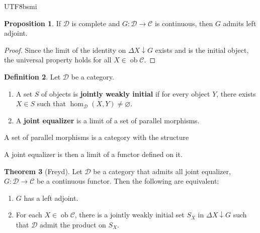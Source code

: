 \documentclass[12pt]{article}
\theoremstyle{definition}
\newtheorem{definition}{Definition}[section]
\newtheorem{theorem}[definition]{Theorem}
\newtheorem{property}[definition]{Proposition}
\newcommand\<{\langle}
\renewcommand\>{\rangle}
\DeclareMathOperator{\ob}{ob}
\begin{document}
\begin{CJK}{UTF8}{bsmi}
\begin{property}
    If $\mathcal{D}$ is complete and $G:\mathcal{D}\to\mathcal{C}$ is continuous, then $G$ admits left adjoint.
\end{property}
\begin{proof}
    Since the limit of the identity on $\Delta X\downarrow G$ exists and is the initial object, the universal property holds for all $X\in\ob\mathcal{C}$.
\end{proof}

\begin{definition}
    Let $\mathcal{D}$ be a category.
    \begin{enumerate}
        \item A set $S$ of objects is \textbf{jointly weakly initial} if for every object $Y$, there exists $X\in S$ such that $\hom_\mathcal{D}(X,Y)\ne\varnothing$.
        \item A \textbf{joint equalizer} is a limit of a set of parallel morphisms.
    \end{enumerate}
\end{definition}

A set of parallel morphisms is a category with the structure
\begin{center}
\end{center}
A joint equalizer is then a limit of a functor defined on it.

\begin{theorem}[Freyd]
    Let $\mathcal{D}$ be a category that admits all joint equalizer, $G:\mathcal{D}\to\mathcal{C}$ be a continuous functor.
    Then the following are equivalent:
    \begin{enumerate}
        \item $G$ has a left adjoint.
        \item For each $X\in\ob\mathcal{C}$, there is a jointly weakly initial set $S_X$ in $\Delta X\downarrow G$ such that $\mathcal{D}$ admit the product on $S_X$.
    \end{enumerate}
\end{theorem}


\end{CJK}
\end{document}
